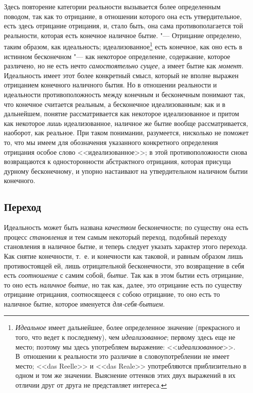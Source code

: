 Здесь повторение категории реальности вызывается более определенным поводом,
так как то отрицание, в отношении которого она есть утвердительное, есть
здесь отрицание отрицания, и, стало быть, она сама противополагается той
реальности, которая есть конечное наличное бытие. "--- Отрицание определено,
таким образом, как идеальность; идеализованное\footnote{{\em Идеальное}
имеет дальнейшее, более определенное значение (прекрасного и
того, что ведет к последнему), чем {\em идеализованное}; первому здесь еще
не место; поэтому мы здесь употребляем выражение: <<{\em идеализованное}>>.
В~отношении к реальности это различие в словоупотреблении не имеет место;
<<das Reelle>> и <<das Reale>> употребляются приблизительно в одном и том же
значении. Выяснение оттенков этих двух выражений в их отличии друг от друга
не представляет интереса.} есть конечное, как оно есть в истинном
бесконечном "--- как некоторое определение, содержание, которое различено, но
не есть нечто {\em самостоятельно сущее}, а имеет бытие
как {\em момент}. Идеальность имеет этот более
конкретный смысл, который не вполне выражен отрицанием конечного наличного
бытия. Но в отношении реальности и идеальности противоположность между
конечным и бесконечным понимают так, что конечное считается реальным, а
бесконечное идеализованным; как и в дальнейшем, понятие рассматривается как
некоторое идеализованное и притом как некоторое
{\em лишь} идеализованное, наличное же бытие вообще
рассматривается, наоборот, как реальное. При таком понимании, разумеется,
нисколько не поможет то, что мы имеем для обозначения указанного
конкретного определения отрицания особое слово <<идеализованное>>; в этой
противоположности снова возвращаются к односторонности абстрактного
отрицания, которая присуща дурному бесконечному, и упорно настаивают на
утвердительном наличном бытии конечного.

\subsection[Переход]{Переход}
Идеальность может быть названа {\em качеством}
бесконечности; по существу она есть процесс
{\em становления} и тем самым некоторый переход,
подобный переходу становления в наличное бытие, и теперь следует указать
характер этого перехода. Как снятие конечности, т.~е. и конечности как
таковой, и равным образом лишь противостоящей ей, лишь отрицательной
бесконечности, это возвращение в себя есть {\em соотношение} с самим собой,
{\em бытие}. Так как в этом бытии есть отрицание, то
оно есть {\em наличное бытие}, но так как, далее, это отрицание есть
по существу отрицание отрицания, соотносящееся с собою отрицание, то
оно есть то наличное бытие, которое именуется {\em для-себя-бытием}.

